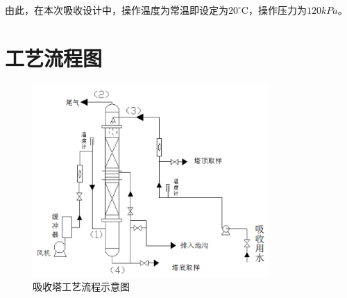 由此，在本次吸收设计中，操作温度为常温即设定为$20^{\circ}$C，操作压力为$120kPa$。



\clearpage
\section{工艺流程图}

\begin{figure}[h]
	\centering
	\includegraphics[width=0.8\textwidth]{./figure/吸收塔工艺流程示意图.png}
	\caption{吸收塔工艺流程示意图}
\end{figure}